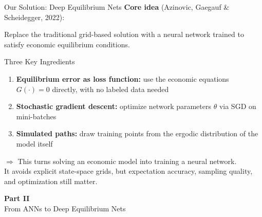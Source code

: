 \documentclass[aspectratio=169,11pt]{beamer}
\newcommand{\emphc}[1]{\textcolor{harvardcrimson}{#1}}
\begin{document}
\begin{frame}{Our Solution: Deep Equilibrium Nets}
\textbf{Core idea} (Azinovic, Gaegauf \& Scheidegger, 2022):

\vspace{0.3em}
Replace the traditional grid-based solution with a \emphc{neural network} trained to satisfy economic equilibrium conditions.

\vspace{0.5em}
\begin{block}{Three Key Ingredients}
\begin{enumerate}
    \item \textbf{Equilibrium error as loss function:} use the economic equations $G(\cdot) = 0$ directly, with \emphc{no labeled data} needed
    \item \textbf{Stochastic gradient descent:} optimize network parameters $\theta$ via SGD on mini-batches
    \item \textbf{Simulated paths:} draw training points from the \emphc{ergodic distribution} of the model itself
\end{enumerate}
\end{block}

\vspace{0.3em}
{\small $\Rightarrow$ This turns \emphc{solving} an economic model into \emphc{training} a neural network.}
\\[2pt]
{\scriptsize It avoids explicit state-space grids, but expectation accuracy, sampling quality, and optimization still matter.}
\end{frame}


\begin{frame}{}
\vfill
\begin{center}
{\Huge \textcolor{uzhblue}{\textbf{Part II}}}\\[12pt]
{\LARGE From ANNs to Deep Equilibrium Nets}
\end{center}
\vfill
\end{frame}
\end{document}
